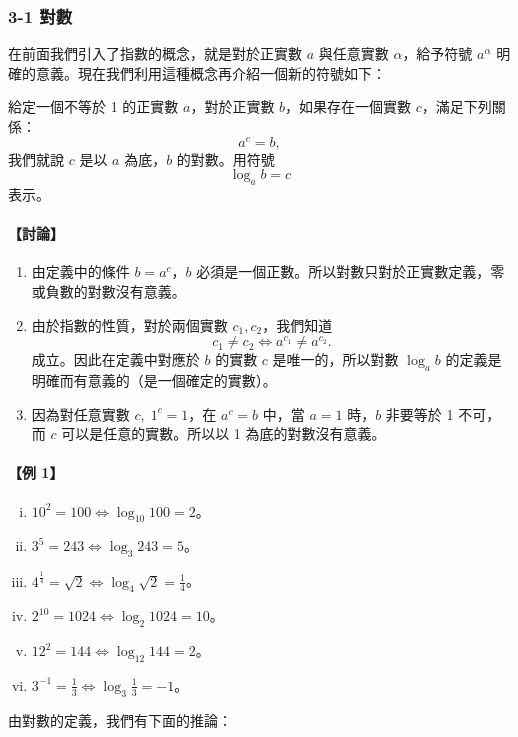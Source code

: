 \subsubsection*{3-1 對數}

在前面我們引入了指數的概念，就是對於正實數 $a$ 與任意實數 $\alpha$，給予符號 $a^\alpha$ 明確的意義。現在我們利用這種概念再介紹一個新的符號如下：

\begin{definition*}
給定一個不等於 1 的正實數 $a$，對於正實數 $b$，如果存在一個實數 $c$，滿足下列關係：
\[
a^c = b,
\]
我們就說 $c$ 是以 $a$ 為底，$b$ 的對數。用符號
\[
\log_a b = c
\]
表示。
\end{definition*}
\paragraph{【討論】}
\begin{enumerate}
    \item 由定義中的條件 $b = a^c$，$b$ 必須是一個正數。所以對數只對於正實數定義，零或負數的對數沒有意義。
    \item 由於指數的性質，對於兩個實數 $c_1, c_2$，我們知道
    \[
    c_1 \neq c_2 \iff a^{c_1} \neq a^{c_2}.
    \]
    成立。因此在定義中對應於 $b$ 的實數 $c$ 是唯一的，所以對數 $\log_a b$ 的定義是明確而有意義的（是一個確定的實數）。
    \item 因為對任意實數 $c,\; 1^c = 1$，在 $a^c = b$ 中，當 $a = 1$ 時，$b$ 非要等於 1 不可，而 $c$ 可以是任意的實數。所以以 1 為底的對數沒有意義。
\end{enumerate}

\paragraph{【例 1】}
\begin{enumerate}[(i)]
    \item $10^2 = 100 \iff \log_{10} 100 = 2$。
    \item $3^5 = 243 \iff \log_3 243 = 5$。
    \item $4^{\frac{1}{4}} = \sqrt{2} \iff \log_4 \sqrt{2} = \frac{1}{4}$。
    \item $2^{10} = 1024 \iff \log_2 1024 = 10$。
    \item $12^2 = 144 \iff \log_{12} 144 = 2$。
    \item $3^{-1} = \frac{1}{3} \iff \log_3 \frac{1}{3} = -1$。
\end{enumerate}

由對數的定義，我們有下面的推論：

